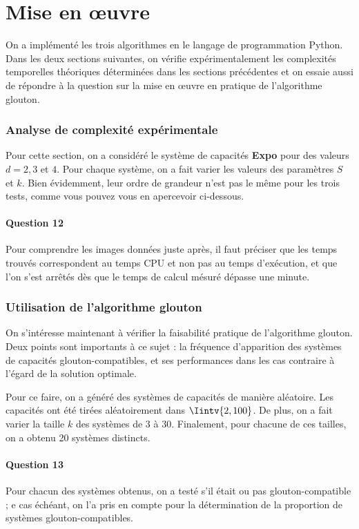 \documentclass[12pt,a4paper]{article}
\begin{document}
 \newpage
 \part{Mise en \oe uvre}
 On a impl\'ement\'e les trois algorithmes en le langage de programmation Python. Dans les deux sections suivantes, on v\'erifie exp\'erimentalement les complexit\'es temporelles th\'eoriques d\'etermin\'ees dans les sections pr\'ec\'edentes et on essaie aussi de r\'epondre \`a la question sur la mise en \oe uvre en pratique de l'algorithme glouton.

 \section{Analyse de complexit\'e exp\'erimentale}
 Pour cette section, on a consid\'er\'e le syst\`eme de capacit\'es {\bfseries Expo} pour des valeurs $d = 2, 3$ et $4$. Pour chaque syst\`eme, on a fait varier les valeurs des param\`etres $S$ et $k$. Bien \'evidemment, leur ordre de grandeur n'est pas le m\^eme pour les trois tests, comme vous pouvez vous en apercevoir ci-dessous.

 \subsection*{Question 12}
 Pour comprendre les images donn\'ees juste apr\`es, il faut pr\'eciser que les temps trouv\'es correspondent au temps CPU et non pas au temps d'ex\'ecution, et que l'on s'est arr\^et\'es d\`es que le temps de calcul m\'esur\'e d\'epasse une minute.

 \section{Utilisation de l'algorithme glouton}
 On s'int\'eresse maintenant \`a v\'erifier la faisabilit\'e pratique de l'algorithme glouton. Deux points sont importants \`a ce sujet : la fr\'equence d'apparition des syst\`emes de capacit\'es glouton-compatibles, et ses performances dans les cas contraire \`a l'\'egard de la solution optimale.
 
 Pour ce faire, on a g\'en\'er\'e des syst\`emes de capacit\'es de mani\`ere al\'eatoire. Les capacit\'es ont \'et\'e tir\'ees al\'eatoirement dans $\Iintv{2,100}$. De plus, on a fait varier la taille $k$ des syst\`emes de 3 \`a 30. Finalement, pour chacune de ces tailles, on a obtenu 20 syst\`emes distincts.

 \subsection*{Question 13}
 Pour chacun des syst\`emes obtenus, on a test\'e s'il \'etait ou pas glouton-compatible ; e cas \'ech\'eant, on l'a pris en compte pour la d\'etermination de la proportion de syst\`emes glouton-compatibles.
 
\end{document}
